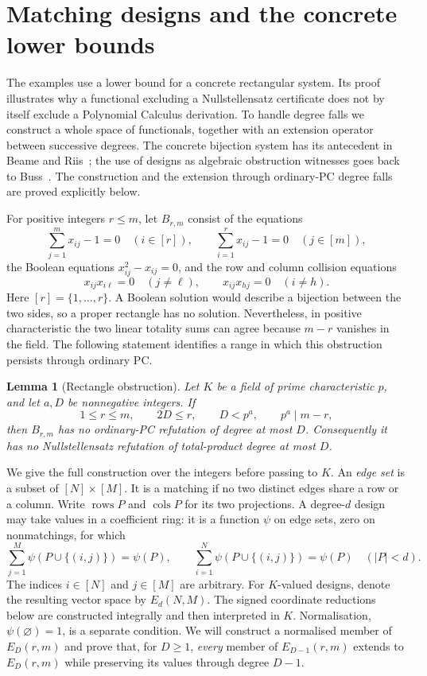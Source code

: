 \documentclass[11pt,a4paper]{article}
\newtheorem{lemma}[theorem]{Lemma}
\theoremstyle{definition}\newtheorem{definition}[theorem]{Definition}
\theoremstyle{remark}\newtheorem{remark}[theorem]{Remark}
\begin{document}
\section{Matching designs and the concrete lower bounds}
\label{app:matching}

The examples use a lower bound for a concrete rectangular system.  Its
proof illustrates why a functional excluding a Nullstellensatz certificate
does not by itself exclude a Polynomial Calculus derivation.  To handle
degree falls we construct a whole space of functionals, together with an
extension operator between successive degrees. The concrete bijection
system has its antecedent in Beame and Riis~\cite{BeameRiis}; the use of
designs as algebraic obstruction witnesses goes back to Buss~\cite{BussDesign}.
The construction and the extension through ordinary-PC degree falls
are proved explicitly below.

For positive integers $r\leq m$, let $B_{r,m}$ consist of the equations
\[
 \sum_{j=1}^{m}x_{ij}-1=0\quad(i\in[r]),\qquad
 \sum_{i=1}^{r}x_{ij}-1=0\quad(j\in[m]),
\]
the Boolean equations $x_{ij}^{2}-x_{ij}=0$, and the row and column
collision equations
\[
 x_{ij}x_{i\ell}=0\quad(j\ne\ell),\qquad
 x_{ij}x_{hj}=0\quad(i\ne h).
\]
Here $[r]=\{1,\ldots,r\}$.  A Boolean solution would describe a bijection
between the two sides, so a proper rectangle has no solution.  Nevertheless,
in positive characteristic the two linear totality sums can agree because
$m-r$ vanishes in the field.  The following statement identifies a range
in which this obstruction persists through ordinary PC.

\begin{lemma}[Rectangle obstruction]\label{lem:rectangle-obstruction}
Let $K$ be a field of prime characteristic $p$, and let $a,D$ be
nonnegative integers.  If
\[
 1\leq r\leq m,\qquad 2D\leq r,\qquad D<p^a,
 \qquad p^a\mid m-r,
\]
then $B_{r,m}$ has no ordinary-PC refutation of degree at most $D$.
Consequently it has no Nullstellensatz refutation of total-product degree
at most $D$.
\end{lemma}

We give the full construction over the integers before passing to $K$.
An \emph{edge set} is a subset of $[N]\times[M]$.  It is a matching if
no two distinct edges share a row or a column.  Write $\operatorname{rows}P$
and $\operatorname{cols}P$ for its two projections.  A degree-$d$ design
may take values in a coefficient ring: it is a function $\psi$ on edge
sets, zero on nonmatchings, for which
\begin{equation}\label{eq:matching-design}
 \sum_{j=1}^{M}\psi(P\cup\{(i,j)\})=\psi(P),\qquad
 \sum_{i=1}^{N}\psi(P\cup\{(i,j)\})=\psi(P)
 \quad(|P|<d).
\end{equation}
The indices $i\in[N]$ and $j\in[M]$ are arbitrary. For $K$-valued
designs, denote the resulting vector space by $E_d(N,M)$. The signed
coordinate reductions below are constructed integrally and then
interpreted in $K$.  Normalisation, $\psi(\varnothing)=1$, is a separate
condition.  We will construct a normalised member of $E_D(r,m)$ and prove
that, for $D\ge1$, \emph{every} member of $E_{D-1}(r,m)$ extends to $E_D(r,m)$ while
preserving its values through degree $D-1$.
\end{document}
